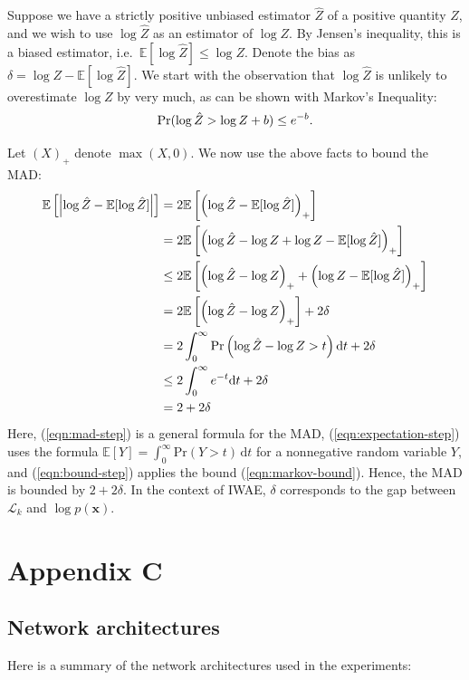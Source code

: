 \documentclass{article} %
\newcommand{\expect}{\mathbb{E}}
\newcommand{\obs}{\mathbf{x}}
\newcommand{\pmfGen}{p}
\newcommand{\numSamples}{k}
\newcommand{\isBoundK}[1]{\mathcal{L}_{#1}}
\begin{document}
Suppose we have a strictly positive unbiased estimator $\hat{Z}$ of a positive quantity $Z$, and we wish to use $\log \hat{Z}$ as an estimator of $\log Z$. By Jensen's inequality, this is a biased estimator, i.e.~$\expect[\log \hat{Z}] \leq \log Z$. Denote the bias as $\delta = \log Z - \expect[\log \hat{Z}]$. We start with the observation that $\log \hat{Z}$ is unlikely to overestimate $\log Z$ by very much, as can be shown with Markov's Inequality:
\begin{equation}
{\rm Pr}(\log \hat{Z} > \log Z + b) \leq e^{-b}. \label{eqn:markov-bound}
\end{equation}

Let $(X)_+$ denote $\max(X, 0)$. We now use the above facts to bound the MAD:
\begin{align}
\expect \left[ \left|\log \hat{Z} - \expect[\log \hat{Z}] \right| \right]
&= 2 \expect \left[ \left(\log \hat{Z} - \expect[\log \hat{Z}] \right)_+ \right] \label{eqn:mad-step} \\
&= 2 \expect \left[ \left(\log \hat{Z} - \log Z + \log Z - \expect[\log \hat{Z}] \right)_+ \right] \\
&\leq 2 \expect \left[ \left(\log \hat{Z} - \log Z \right)_+ + \left( \log Z - \expect[\log \hat{Z}] \right)_+ \right] \\
&= 2 \expect \left[ \left(\log \hat{Z} - \log Z \right)_+ \right] + 2 \delta \\
&= 2 \int_0^\infty {\rm Pr} \left( \log \hat{Z} - \log Z > t \right) \mathrm{d}t + 2 \delta \label{eqn:expectation-step} \\
&\leq 2 \int_0^\infty e^{-t} \mathrm{d}t + 2 \delta \label{eqn:bound-step} \\
&= 2 + 2 \delta
\end{align}
Here, (\ref{eqn:mad-step}) is a general formula for the MAD, (\ref{eqn:expectation-step}) uses the formula $\expect[Y] = \int_0^\infty \mathrm{Pr}(Y > t)\, \mathrm{d}t$ for a nonnegative random variable $Y$, and (\ref{eqn:bound-step}) applies the bound (\ref{eqn:markov-bound}). Hence, the MAD is bounded by $2 + 2 \delta$. In the context of IWAE, $\delta$ corresponds to the gap between $\isBoundK{\numSamples}$ and $\log \pmfGen(\obs)$.

\section*{Appendix C}
\label{app:visualizations}


\subsection*{Network architectures}
Here is a summary of the network architectures used in the experiments:
\end{document}
